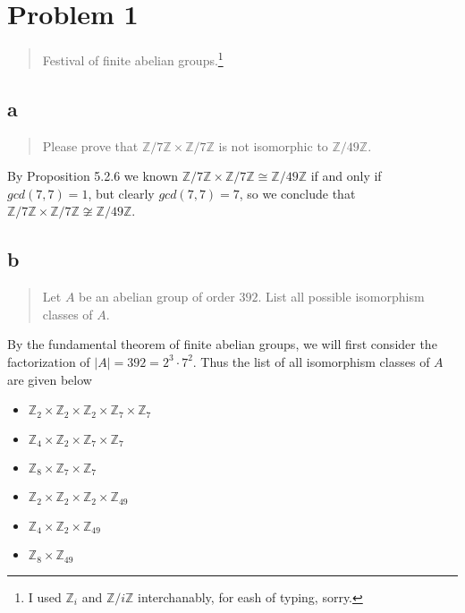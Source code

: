 \hypertarget{problem-1}{%
\section{Problem 1}\label{problem-1}}

\begin{quote}
Festival of finite abelian groups.\footnote{I used \(\mathbb{Z}_i\) and
  \(\mathbb{Z}/i\mathbb{Z}\) interchanably, for eash of typing, sorry.}
\end{quote}

\hypertarget{a}{%
\subsection{a}\label{a}}

\begin{quote}
Please prove that \(\mathbb{Z}/7\mathbb{Z}\times\mathbb{Z}/7\mathbb{Z}\)
is not isomorphic to \(\mathbb{Z}/49\mathbb{Z}\).
\end{quote}

By Proposition 5.2.6 we known
\(\mathbb{Z}/7\mathbb{Z}\times\mathbb{Z}/7\mathbb{Z}\cong\mathbb{Z}/49\mathbb{Z}\)
if and only if \(gcd(7,7)=1\), but clearly \(gcd(7,7)=7\), so we
conclude that
\(\mathbb{Z}/7\mathbb{Z}\times\mathbb{Z}/7\mathbb{Z}\not\cong\mathbb{Z}/49\mathbb{Z}\).

\hypertarget{b}{%
\subsection{b}\label{b}}

\begin{quote}
Let \(A\) be an abelian group of order \(392\). List all possible
isomorphism classes of \(A\).
\end{quote}

By the fundamental theorem of finite abelian groups, we will first
consider the factorization of \(|A|=392=2^3\cdot7^2\). Thus the list of
all isomorphism classes of \(A\) are given below

\begin{itemize}
\tightlist
\item
  \(\mathbb{Z}_2\times\mathbb{Z}_2\times\mathbb{Z}_2\times\mathbb{Z}_7\times\mathbb{Z}_7\)
\item
  \(\mathbb{Z}_4\times\mathbb{Z}_2\times\mathbb{Z}_7\times\mathbb{Z}_7\)
\item
  \(\mathbb{Z}_8\times\mathbb{Z}_7\times\mathbb{Z}_7\)
\item
  \(\mathbb{Z}_2\times\mathbb{Z}_2\times\mathbb{Z}_2\times\mathbb{Z}_{49}\)
\item
  \(\mathbb{Z}_4\times\mathbb{Z}_2\times\mathbb{Z}_{49}\)
\item
  \(\mathbb{Z}_8\times\mathbb{Z}_{49}\)
\end{itemize}

